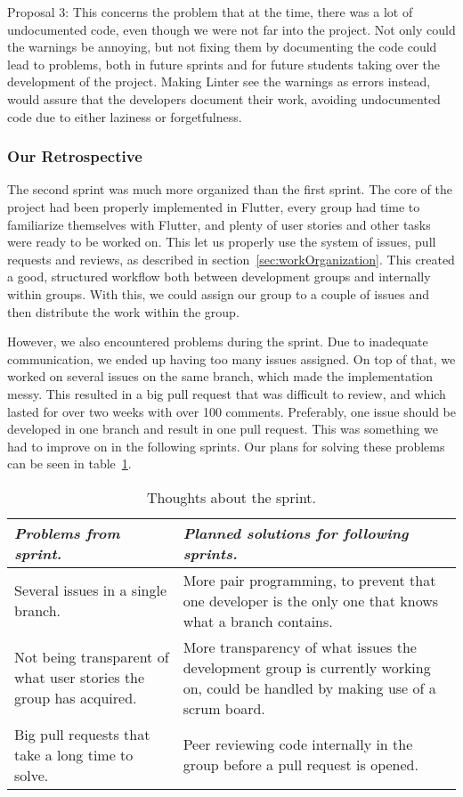 Proposal 3: This concerns the problem that at the time, there was a lot of undocumented code, even though we were not far into the project. Not only could the warnings be annoying, but not fixing them by documenting the code could lead to problems, both in future sprints and for future students taking over the development of the project. Making Linter see the warnings as errors instead, would assure that the developers document their work, avoiding undocumented code due to either laziness or forgetfulness.



\subsubsection{Our Retrospective}
\label{sect:ourRetrospectiveSprint2}

The second sprint was much more organized than the first sprint. The core of the project had been properly implemented in Flutter, every group had time to familiarize themselves with Flutter, and plenty of user stories and other tasks were ready to be worked on. This let us properly use the system of issues, pull requests and reviews, as described in section~\ref{sec:workOrganization}. This created a good, structured workflow both between development groups and internally within groups. With this, we could assign our group to a couple of issues and then distribute the work within the group.

However, we also encountered problems during the sprint. Due to inadequate communication, we ended up having too many issues assigned. On top of that, we worked on several issues on the same branch, which made the implementation messy. This resulted in a big pull request that was difficult to review, and which lasted for over two weeks with over 100 comments. Preferably, one issue should be developed in one branch and result in one pull request. This was something we had to improve on in the following sprints. Our plans for solving these problems can be seen in table~\ref{table:ourRetrospectiveIdeasSprint2}.

\begin{table}[ht]
\begin{tabularx}{\textwidth}{X|X}
\textit{Problems from sprint.} & \textit{Planned solutions for following sprints.} \\\hline
Several issues in a single branch. &  More pair programming, to prevent that one developer is the only one that knows what a branch contains. \\ \hline
Not being transparent of what user stories the group has acquired. & More transparency of what issues the development group is currently working on, could be handled by making use of a scrum board. \\\hline
Big pull requests that take a long time to solve. & Peer reviewing code internally in the group before a pull request is opened. \\\hline
\end{tabularx}
\caption{Thoughts about the sprint.}
\label{table:ourRetrospectiveIdeasSprint2}
\end{table}

